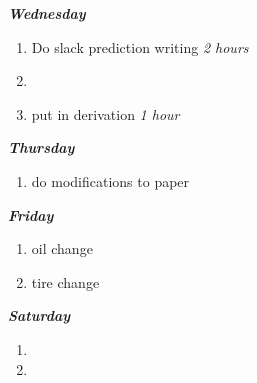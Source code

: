 \documentclass[11pt]{article}
\newcommand{\timeEst}[1]{\textit{#1}}
\begin{document}
\textbf{\textit{Wednesday}}
\begin{enumerate}
\item Do slack prediction writing \timeEst{2 hours}
\item
\item put in derivation \timeEst{1 hour}
\end{enumerate}

\textbf{\textit{Thursday}}
\begin{enumerate}
\item do modifications to paper
\end{enumerate}

\textbf{\textit{Friday}}
\begin{enumerate}
\item oil change
\item tire change
\end{enumerate}

\textbf{\textit{Saturday}}
\begin{enumerate}
\item
\item
\end{enumerate}

\newpage
\end{document}
